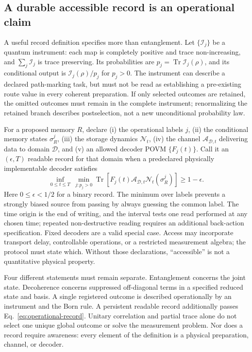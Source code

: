 \subsection{A durable accessible record is an operational claim}
A useful record definition specifies more than entanglement. Let $\{\mathcal I_j\}$ be a quantum instrument: each map is completely positive and trace non-increasing, and $\sum_j\mathcal I_j$ is trace preserving. Its probabilities are $p_j=\operatorname{Tr}\mathcal I_j(\rho)$, and its conditional output is $\mathcal I_j(\rho)/p_j$ for $p_j>0$. The instrument can describe a declared path-marking task, but must not be read as establishing a pre-existing route value in every coherent preparation. If only selected outcomes are retained, the omitted outcomes must remain in the complete instrument; renormalizing the retained branch describes postselection, not a new unconditional probability law.

For a proposed memory $R$, declare (i) the operational labels $j$, (ii) the conditional memory states $\sigma_R^j$, (iii) the storage dynamics $\mathcal N_t$, (iv) the channel $\mathcal A_{\mathcal D,t}$ delivering data to domain $\mathcal D$, and (v) an allowed decoder POVM $\{F_j(t)\}$. Call it an $(\epsilon,T)$ readable record for that domain when a predeclared physically implementable decoder satisfies
\begin{equation}
 \inf_{0\leq t\leq T}\ \min_{j:p_j>0}
 \operatorname{Tr}\!\left[F_j(t)
 \mathcal A_{\mathcal D,t}\mathcal N_t(\sigma_R^j)\right]
 \geq1-\epsilon .
 \label{eq:operational-record}
\end{equation}
Here $0\leq\epsilon<1/2$ for a binary record. The minimum over labels prevents a strongly biased source from passing by always guessing the common label. The time origin is the end of writing, and the interval tests one read performed at any chosen time; repeated non-destructive reading requires an additional back-action specification. Fixed decoders are a valid special case. Access may incorporate transport delay, controllable operations, or a restricted measurement algebra; the protocol must state which. Without those declarations, ``accessible'' is not a quantitative physical property.

Four different statements must remain separate. Entanglement concerns the joint state. Decoherence concerns suppressed off-diagonal terms in a specified reduced state and basis. A single registered outcome is described operationally by an instrument and the Born rule. A persistent readable record additionally passes Eq.~\eqref{eq:operational-record}. Unitary correlation and partial trace alone do not select one unique global outcome or solve the measurement problem.\cite{Schlosshauer2005} Nor does a record require awareness: every element of the definition is a physical preparation, channel, or decoder.

